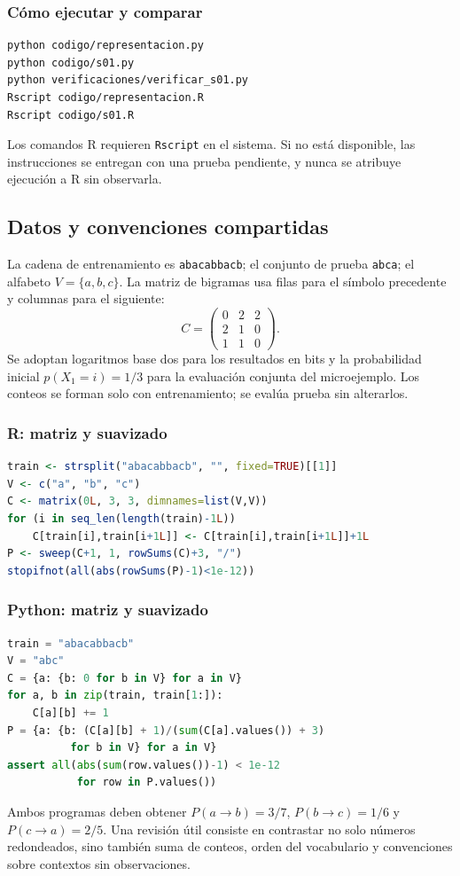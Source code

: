 \subsubsection{Cómo ejecutar y comparar}
\begin{lstlisting}
python codigo/representacion.py
python codigo/s01.py
python verificaciones/verificar_s01.py
Rscript codigo/representacion.R
Rscript codigo/s01.R
\end{lstlisting}
\noindent Los comandos R requieren \texttt{Rscript} en el sistema. Si no está disponible, las instrucciones se entregan con una prueba pendiente, y nunca se atribuye ejecución a R sin observarla.





\subsection{Datos y convenciones compartidas}
La cadena de entrenamiento es \texttt{abacabbacb}; el conjunto de prueba
\texttt{abca}; el alfabeto $V=\{a,b,c\}$. La matriz de bigramas usa
filas para el símbolo precedente y columnas para el siguiente:
\[
C=\begin{pmatrix}0&2&2\\2&1&0\\1&1&0\end{pmatrix}.
\]
Se adoptan logaritmos base dos para los resultados en bits y la
probabilidad inicial $p(X_1=i)=1/3$ para la evaluación conjunta del
microejemplo. Los conteos se forman solo con entrenamiento; se evalúa
prueba sin alterarlos.
\subsubsection{R: matriz y suavizado}
\begin{lstlisting}[language=R]
train <- strsplit("abacabbacb", "", fixed=TRUE)[[1]]
V <- c("a", "b", "c")
C <- matrix(0L, 3, 3, dimnames=list(V,V))
for (i in seq_len(length(train)-1L))
    C[train[i],train[i+1L]] <- C[train[i],train[i+1L]]+1L
P <- sweep(C+1, 1, rowSums(C)+3, "/")
stopifnot(all(abs(rowSums(P)-1)<1e-12))
\end{lstlisting}
\subsubsection{Python: matriz y suavizado}
\begin{lstlisting}[language=Python]
train = "abacabbacb"
V = "abc"
C = {a: {b: 0 for b in V} for a in V}
for a, b in zip(train, train[1:]):
    C[a][b] += 1
P = {a: {b: (C[a][b] + 1)/(sum(C[a].values()) + 3)
          for b in V} for a in V}
assert all(abs(sum(row.values())-1) < 1e-12
           for row in P.values())
\end{lstlisting}
Ambos programas deben obtener
$P(a\to b)=3/7$, $P(b\to c)=1/6$ y $P(c\to a)=2/5$.
Una revisión útil consiste en contrastar no solo números redondeados,
sino también suma de conteos, orden del vocabulario y convenciones
sobre contextos sin observaciones.
